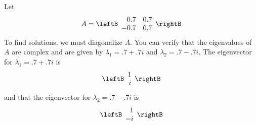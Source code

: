 \begin{solution}
Let
\begin{equation*}
A
=
\leftB 
\begin{array}{rr}
0.7 & 0.7 \\
-0.7 & 0.7
\end{array}
\rightB
\end{equation*}
To find solutions, we must diagonalize $A$. You can verify that the eigenvalues of $A$ are complex and are given by  $\lambda_1 = .7+.7i$ and $\lambda_2 = .7-.7i$. The eigenvector for $\lambda_1 = .7+.7i$ is 
\begin{equation*}
\leftB
\begin{array}{r}
1 \\
i
\end{array}
\rightB 
\end{equation*}
and that the eigenvector for $\lambda_2 = .7-.7i$ is
\begin{equation*}
\leftB
\begin{array}{r}
1 \\
-i
\end{array}
\rightB  
\end{equation*}


\end{solution}
